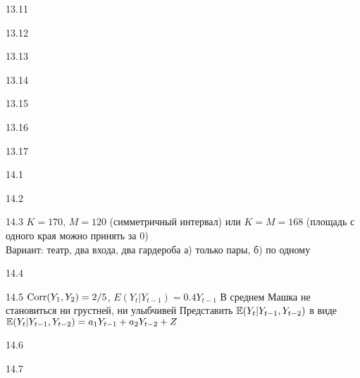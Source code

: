 \protect \hypertarget {soln:13.11}{}
\begin{solution}{{13.11}}
\end{solution}
\protect \hypertarget {soln:13.12}{}
\begin{solution}{{13.12}}
\end{solution}
\protect \hypertarget {soln:13.13}{}
\begin{solution}{{13.13}}
\end{solution}
\protect \hypertarget {soln:13.14}{}
\begin{solution}{{13.14}}
\end{solution}
\protect \hypertarget {soln:13.15}{}
\begin{solution}{{13.15}}
\end{solution}
\protect \hypertarget {soln:13.16}{}
\begin{solution}{{13.16}}
\end{solution}
\protect \hypertarget {soln:13.17}{}
\begin{solution}{{13.17}}
\end{solution}
\protect \hypertarget {soln:14.1}{}
\begin{solution}{{14.1}}
\end{solution}
\protect \hypertarget {soln:14.2}{}
\begin{solution}{{14.2}}
\end{solution}
\protect \hypertarget {soln:14.3}{}
\begin{solution}{{14.3}}
  $K=170$, $M=120$ (симметричный интервал) или $K=M=168$ (площадь с одного края можно принять за 0) \\
  Вариант: театр, два входа, два гардероба а) только пары, б) по одному
\end{solution}
\protect \hypertarget {soln:14.4}{}
\begin{solution}{{14.4}}
\end{solution}
\protect \hypertarget {soln:14.5}{}
\begin{solution}{{14.5}}
  $\operatorname{Corr}(Y_1, Y_2) = 2/5$, $E(Y_t | Y_{t-1}) = 0.4 Y_{t-1}$
  В среднем Машка не становиться ни грустней, ни улыбчивей
  Представить $\mathbb{E}(Y_t | Y_{t-1}, Y_{t-2})$ в виде $\mathbb{E}(Y_t | Y_{t-1}, Y_{t-2}) = a_1 Y_{t-1} + a_2 Y_{t-2} + Z$
\end{solution}
\protect \hypertarget {soln:14.6}{}
\begin{solution}{{14.6}}
\end{solution}
\protect \hypertarget {soln:14.7}{}
\begin{solution}{{14.7}}
\end{solution}
